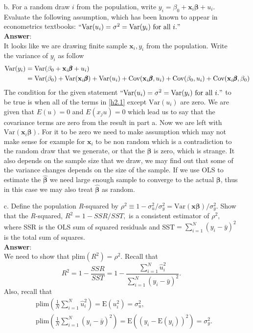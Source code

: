 \documentclass[10pt]{article}
\newcommand{\E}{\text{E}}
\newcommand{\V}{\text{Var}}
\newcommand{\cov}{\text{Cov}}
\newcommand{\plim}{\text{plim}}
\begin{document}
\begin{enumerate}
\item[b.] For a random draw $i$ from the population, write $y_i=\beta_0+\textbf{x}_i\pmb{\beta}+u_i.$ Evaluate the following assumption, which has been known to appear in econometrics textbooks: $``\V(u_i)=\sigma^2=\V(y_i) \text{ for all }i."$
\\ \textbf{Answer}:\\
It looks like we are drawing finite sample $\textbf{x}_i,y_i$ from the population. Write the variance of $y_i$ as follow
\begin{align}
    \V(y_i)&=\V(\beta_0+\textbf{x}_i\pmb{\beta}+u_i) \notag\\
    &=\V(\beta_0)+\V(\textbf{x}_i\pmb{\beta})+\V(u_i)+\cov(\textbf{x}_i\pmb{\beta},u_i)+\cov(\beta_0,u_i)+\cov(\textbf{x}_i\pmb{\beta},\beta_0) \label{h2.1}
\end{align}
The condition for the given statement $``\V(u_i)=\sigma^2=\V(y_i) \text{ for all }i."$ to be true is when all of the terms in \eqref{h2.1} except $\V(u_i)$ are zero. We are given that $E(u)=0$ and $E(x_j u)=0$ which lead us to say that the covariance terms are zero from the result in part a. Now we are left with $\V(\textbf{x}_i\pmb{\beta})$. For it to be zero we need to make assumption which may not make sense for example for $\textbf{x}_i$ to be non random which is a contradiction to the random draw that we generate, or that the $\pmb{\beta}$ is zero, which is strange. It also depends on the sample size that we draw, we may find out that some of the variance changes depends on the size of the sample. If we use OLS to estimate the $\hat{\pmb{\beta}}$ we need large enough sample to converge to the actual $\pmb{\beta}$, thus in this case we may also treat $\hat{\pmb{\beta}}$ as random.
\item[c.] Define the population \textit{R}-squared by $\rho^2 \equiv 1-\sigma_u^2 / \sigma_y^2=\V(\textbf{x}\pmb{\beta})/\sigma_y^2.$ Show that the \textit{R}-squared, $R^2=1-SSR/SST,$ is a consistent estimator of $\rho^2,$ where SSR is the OLS sum of squared residuals and SST$=\sum_{i=1}^N (y_i-\bar{y})^2$ is the total sum of squares.
\\ \textbf{Answer}:\\
We need to show that $\plim(R^2)=\rho^2.$ Recall that 
\[R^2=1-\frac{SSR}{SST}=1-\frac{\sum_{i=1}^N\hat{u}_i^2}{\sum_{i=1}^N(y_i-\bar{y})^2}.\]
Also, recall that 
\begin{align*}
    &\plim(\frac{1}{N}\sum_{i=1}^N\hat{u}_i^2)=\E(u_i^2)=\sigma_u^2,\\
    &\plim(\frac{1}{N}\sum_{i=1}^N(y_i-\bar{y})^2)=\E((y_i-\E(y_i))^2)=\sigma_y^2.

\end{align*}
\end{enumerate}
\end{document}
